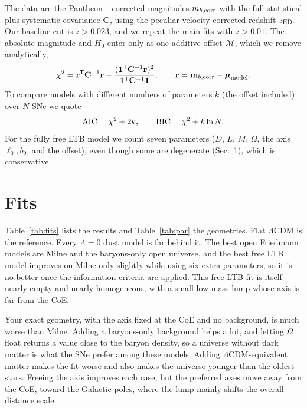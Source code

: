 \documentclass[10pt,twocolumn,letterpaper]{article}
\begin{document}
The data are the Pantheon+ corrected magnitudes $m_{b,\rm corr}$ with the full statistical plus systematic covariance $\mathbf C$, using the peculiar-velocity-corrected redshift $z_{\rm HD}$. Our baseline cut is $z>0.023$, and we repeat the main fits with $z>0.01$. The absolute magnitude and $H_0$ enter only as one additive offset $\mathcal M$, which we remove analytically,
\begin{equation}\label{eq:chi2}
\chi^2=\mathbf r^{\sf T}\mathbf C^{-1}\mathbf r-\frac{(\mathbf 1^{\sf T}\mathbf C^{-1}\mathbf r)^2}{\mathbf 1^{\sf T}\mathbf C^{-1}\mathbf 1},\qquad \mathbf r=\mathbf m_{b,\rm corr}-\boldsymbol\mu_{\rm model}.
\end{equation}
To compare models with different numbers of parameters $k$ (the offset included) over $N$ SNe we quote
\begin{equation}\label{eq:ic}
{\rm AIC}=\chi^2+2k,\qquad {\rm BIC}=\chi^2+k\ln N .
\end{equation}
For the fully free LTB model we count seven parameters ($D$, $L$, $M$, $\Omega$, the axis $\ell_0,b_0$, and the offset), even though some are degenerate (Sec.~\ref{sec:fits}), which is conservative.

\section{Fits}\label{sec:fits}
Table~\ref{tab:fits} lists the results and Table~\ref{tab:par} the geometries. Flat $\Lambda$CDM is the reference. Every $\Lambda=0$ dust model is far behind it. The best open Friedmann models are Milne and the baryons-only open universe, and the best free LTB model improves on Milne only slightly while using six extra parameters, so it is no better once the information criteria are applied. This free LTB fit is itself nearly empty and nearly homogeneous, with a small low-mass lump whose axis is far from the CoE.

Your exact geometry, with the axis fixed at the CoE and no background, is much worse than Milne. Adding a baryons-only background helps a lot, and letting $\Omega$ float returns a value close to the baryon density, so a universe without dark matter is what the SNe prefer among these models. Adding $\Lambda$CDM-equivalent matter makes the fit worse and also makes the universe younger than the oldest stars. Freeing the axis improves each case, but the preferred axes move away from the CoE, toward the Galactic poles, where the lump mainly shifts the overall distance scale.
\end{document}
